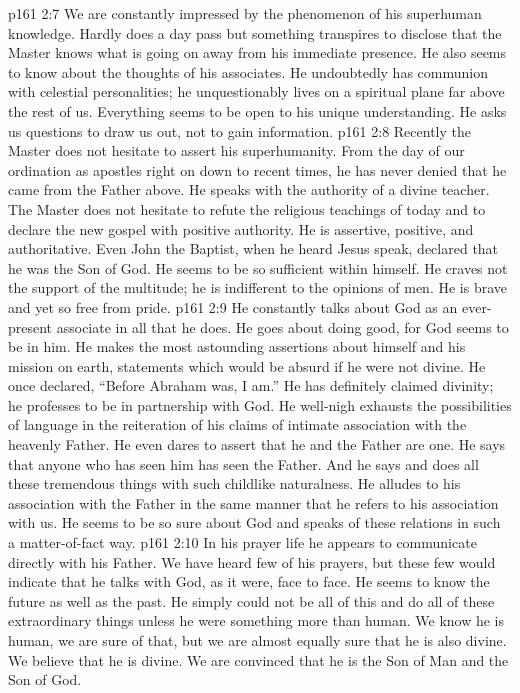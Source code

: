 \pc \vs p161 2:7 \bibnobreakspace We are constantly impressed by the phenomenon of his superhuman knowledge. Hardly does a day pass but something transpires to disclose that the Master knows what is going on away from his immediate presence. He also seems to know about the thoughts of his associates. He undoubtedly has communion with celestial personalities; he unquestionably lives on a spiritual plane far above the rest of us. Everything seems to be open to his unique understanding. He asks us questions to draw us out, not to gain information.
\pc \vs p161 2:8 \bibnobreakspace Recently the Master does not hesitate to assert his superhumanity. From the day of our ordination as apostles right on down to recent times, he has never denied that he came from the Father above. He speaks with the authority of a divine teacher. The Master does not hesitate to refute the religious teachings of today and to declare the new gospel with positive authority. He is assertive, positive, and authoritative. Even John the Baptist, when he heard Jesus speak, declared that he was the Son of God. He seems to be so sufficient within himself. He craves not the support of the multitude; he is indifferent to the opinions of men. He is brave and yet so free from pride.
\pc \vs p161 2:9 \bibnobreakspace He constantly talks about God as an ever\hyp{}present associate in all that he does. He goes about doing good, for God seems to be in him. He makes the most astounding assertions about himself and his mission on earth, statements which would be absurd if he were not divine. He once declared, \textcolor{ubdarkred}{“Before Abraham was, I am.”} He has definitely claimed divinity; he professes to be in partnership with God. He well\hyp{}nigh exhausts the possibilities of language in the reiteration of his claims of intimate association with the heavenly Father. He even dares to assert that he and the Father are one. He says that anyone who has seen him has seen the Father. And he says and does all these tremendous things with such childlike naturalness. He alludes to his association with the Father in the same manner that he refers to his association with us. He seems to be so sure about God and speaks of these relations in such a matter\hyp{}of\hyp{}fact way.
\pc \vs p161 2:10 \bibnobreakspace In his prayer life he appears to communicate directly with his Father. We have heard few of his prayers, but these few would indicate that he talks with God, as it were, face to face. He seems to know the future as well as the past. He simply could not be all of this and do all of these extraordinary things unless he were something more than human. We know he is human, we are sure of that, but we are almost equally sure that he is also divine. We believe that he is divine. We are convinced that he is the Son of Man and the Son of God.\plusone
